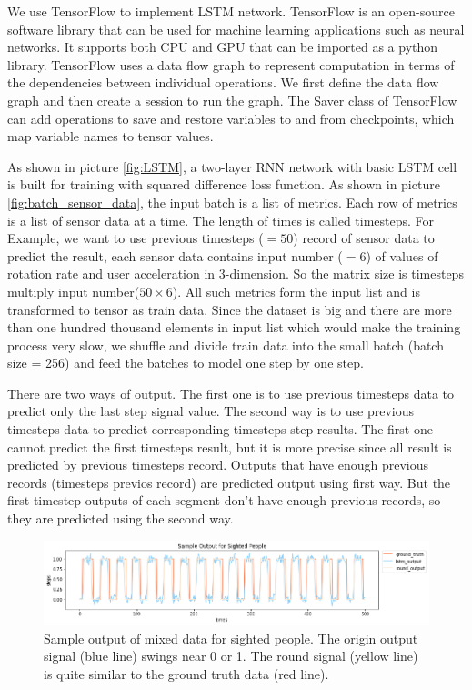 \documentclass[11pt]{article}
\begin{document}
{We use TensorFlow to implement LSTM network. TensorFlow is an open-source software library that can be used for machine learning applications such as neural networks. It supports both CPU and GPU that can be imported as a python library. TensorFlow uses a data flow graph to represent computation in terms of the dependencies between individual operations. We first define the data flow graph and then create a session to run the graph. The Saver class of TensorFlow can add operations to save and restore variables to and from checkpoints, which map variable names to tensor values.

As shown in picture \ref{fig:LSTM}, a two-layer RNN network with basic LSTM cell is built for training with squared difference loss function. 
As shown in picture \ref{fig:batch_sensor_data}, the input batch is a list of metrics. Each row of metrics is a list of sensor data at a time. The length of times is called timesteps.
For Example, we want to use previous timesteps ($=50$) record of sensor data to predict the result, each sensor data contains input number ($=6$) of values of rotation rate and user acceleration in 3-dimension. So the matrix size is timesteps multiply input number($50 \times 6$). All such metrics form the input list and is transformed to tensor as train data. Since the dataset is big and there are more than one hundred thousand elements in input list which would make the training process very slow, we shuffle and divide train data into the small batch (batch size = 256) and feed the batches to model one step by one step.

There are two ways of output. The first one  is to use previous timesteps data to predict only the last step signal value. The second way is to use previous timesteps data to predict corresponding timesteps step results. The first one cannot predict the first timesteps result, but it is more precise since all result is predicted by previous timesteps record.  Outputs that have enough previous records (timesteps previos record) are predicted output using first way. But the first timestep outputs of each segment don't have enough previous records, so they are predicted using the second way.


\begin{figure}[ht]
\centering
\includegraphics[scale=0.5]{output_sighted}
\caption{Sample output of mixed data for sighted people. The origin output signal (blue line) swings near 0 or 1. The round signal (yellow line) is quite similar to the ground truth data (red line).}
\label{fig:output_sighted}
\end{figure}



}
\end{document}

